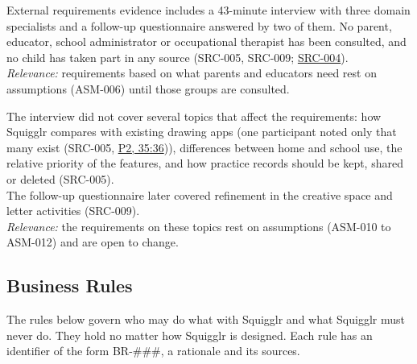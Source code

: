 \documentclass[12pt]{article}
\renewcommand{\_}{\textunderscore\allowbreak}%
\newcommand{\intlink}[3]{\hyperref[int:#1-#2]{#3}}
\newcommand{\intref}[2]{\intlink{#1}{#2}{#1, #2}}
\newcommand{\srcref}[1]{\hyperref[src:#1]{SRC-#1}}
\begin{document}
\begin{description}[style=nextline]
\item[FACT-012] External requirements evidence includes a 43-minute interview
with three domain specialists and a follow-up questionnaire answered by two of
them. No parent, educator, school administrator or occupational therapist has
been consulted, and no child has taken part in any source (SRC-005, SRC-009;
\srcref{004}).\\
\emph{Relevance:} requirements based on what parents and educators need rest on
assumptions (ASM-006) until those groups are consulted.
\item[FACT-013] The interview did not cover several topics that affect the
requirements: how Squigglr compares with existing drawing apps (one participant
noted only that many exist (SRC-005, \intref{P2}{35:36})), differences between
home and school use, the relative priority of the features, and how practice
records should be kept, shared or deleted (SRC-005).\\
The follow-up questionnaire later covered refinement in the creative space and
letter activities (SRC-009).\\
\emph{Relevance:} the requirements on these topics rest on assumptions (ASM-010
to ASM-012) and are open to change.
\end{description}

\subsection{Business Rules}
\label{sec:business-rules}
The rules below govern who may do what with Squigglr and what Squigglr must
never do. They hold no matter how Squigglr is designed. Each rule has an
identifier of the form BR-\#\#\#, a rationale and its sources.
\end{document}
